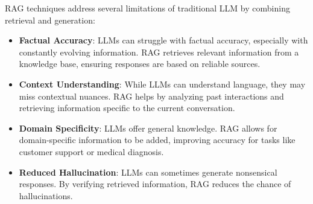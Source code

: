 \documentclass[../main.tex]{subfiles}
\begin{document}
RAG techniques address several limitations of traditional \gls{LLM} by combining retrieval and generation:
\begin{itemize}
	\item{\textbf{Factual Accuracy}: LLMs can struggle with factual accuracy, especially with constantly evolving information. \gls{RAG} retrieves relevant information from a knowledge base, ensuring responses are based on reliable sources.}
	\item{\textbf{Context Understanding}: While \gls{LLM}s can understand language, they may miss contextual nuances. \gls{RAG} helps by analyzing past interactions and retrieving information specific to the current conversation.}
	\item{\textbf{Domain Specificity}: \gls{LLM}s offer general knowledge. \gls{RAG} allows for domain-specific information to be added, improving accuracy for tasks like customer support or medical diagnosis.}
	\item{\textbf{Reduced Hallucination}: \gls{LLM}s can sometimes generate nonsensical responses. By verifying retrieved information, \gls{RAG} reduces the chance of hallucinations.}
\end{itemize}
\end{document}
